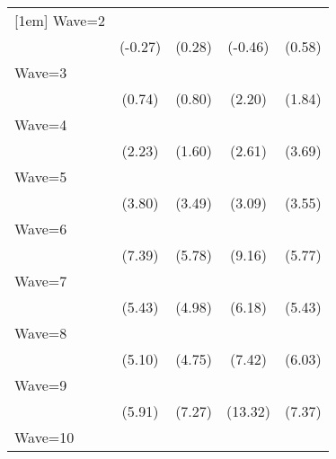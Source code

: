{\begin{tabular}{l*{4}{c}}
[1em]
Wave=2              &                     &                     &                     &                     \\
                    &     (-0.27)         &      (0.28)         &     (-0.46)         &      (0.58)         \\
[1em]
Wave=3              &                     &                     &            \sym{*}  &                     \\
                    &      (0.74)         &      (0.80)         &      (2.20)         &      (1.84)         \\
[1em]
Wave=4              &            \sym{*}  &                     &            \sym{**} &            \sym{***}\\
                    &      (2.23)         &      (1.60)         &      (2.61)         &      (3.69)         \\
[1em]
Wave=5              &            \sym{***}&            \sym{***}&            \sym{**} &            \sym{***}\\
                    &      (3.80)         &      (3.49)         &      (3.09)         &      (3.55)         \\
[1em]
Wave=6              &            \sym{***}&            \sym{***}&            \sym{***}&            \sym{***}\\
                    &      (7.39)         &      (5.78)         &      (9.16)         &      (5.77)         \\
[1em]
Wave=7              &            \sym{***}&            \sym{***}&            \sym{***}&            \sym{***}\\
                    &      (5.43)         &      (4.98)         &      (6.18)         &      (5.43)         \\
[1em]
Wave=8              &            \sym{***}&            \sym{***}&            \sym{***}&            \sym{***}\\
                    &      (5.10)         &      (4.75)         &      (7.42)         &      (6.03)         \\
[1em]
Wave=9              &            \sym{***}&            \sym{***}&            \sym{***}&            \sym{***}\\
                    &      (5.91)         &      (7.27)         &     (13.32)         &      (7.37)         \\
[1em]
Wave=10             &            \sym{***}&            \sym{***}&            \sym{***}&            \sym{***}\\

\end{tabular}}
